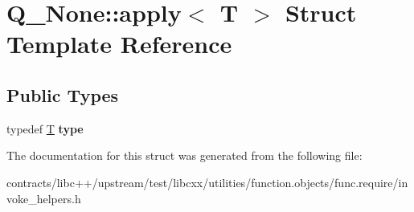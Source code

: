 \hypertarget{struct_q___none_1_1apply}{}\section{Q\+\_\+\+None\+:\+:apply$<$ T $>$ Struct Template Reference}
\label{struct_q___none_1_1apply}
\subsection*{Public Types}
\begin{DoxyCompactItemize}
\item 
\mbox{\label{struct_q___none_1_1apply_aef802a5c493d771aec9b77013451a8d2}} 
typedef \mbox{\hyperlink{struct_t}{T}} {\bfseries type}
\end{DoxyCompactItemize}


The documentation for this struct was generated from the following file\+:\begin{DoxyCompactItemize}
\item 
contracts/libc++/upstream/test/libcxx/utilities/function.\+objects/func.\+require/invoke\+\_\+helpers.\+h\end{DoxyCompactItemize}
